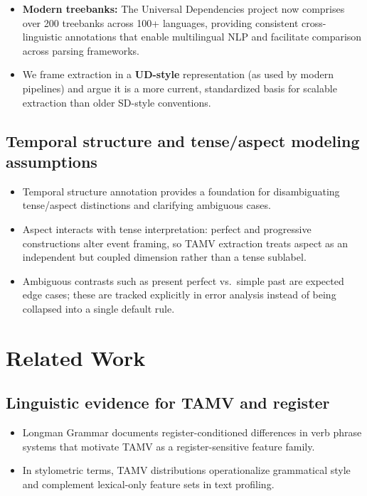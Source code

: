 \documentclass[11pt]{article}
\begin{document}
\begin{itemize}
\begin{itemize}
    \end{itemize}
  \item \textbf{Modern treebanks:} The Universal Dependencies project now comprises over 200 treebanks across 100+ languages, providing consistent cross-linguistic annotations that enable multilingual NLP and facilitate comparison across parsing frameworks. \citep{Nivre2020UniversalCollection}
  \item We frame extraction in a \textbf{UD-style} representation (as used by modern pipelines) and argue it is a more current, standardized basis for scalable extraction than older SD-style conventions. \citep{Nivre2010DependencyParsing,Okhapkin2021ConstructingLibraries}
\end{itemize}

\subsection{Temporal structure and tense/aspect modeling assumptions}
\begin{itemize}
  \item Temporal structure annotation provides a foundation for disambiguating tense/aspect distinctions and clarifying ambiguous cases. \citep{Derczynski2012AnStructure}
  \item Aspect interacts with tense interpretation: perfect and progressive constructions alter event framing, so TAMV extraction treats aspect as an independent but coupled dimension rather than a tense sublabel. \citep{Biber20101999LongmanEnglish}
  \item Ambiguous contrasts such as present perfect vs.\ simple past are expected edge cases; these are tracked explicitly in error analysis instead of being collapsed into a single default rule. \citep{Derczynski2012AnStructure,Biber20101999LongmanEnglish}
\end{itemize}

\section{Related Work}
\subsection{Linguistic evidence for TAMV and register}
\begin{itemize}
  \item Longman Grammar documents register-conditioned differences in verb phrase systems that motivate TAMV as a register-sensitive feature family. \citep{Biber20101999LongmanEnglish}
  \item In stylometric terms, TAMV distributions operationalize grammatical style and complement lexical-only feature sets in text profiling. \citep{Stamatatos2009SurveyMethods,Koppel2009ComputationalMethods}
\end{itemize}
\end{document}

